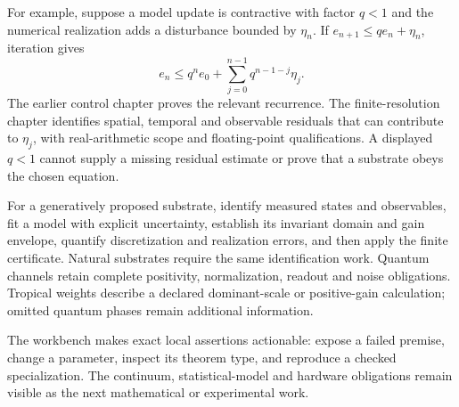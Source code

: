 For example, suppose a model update is contractive with factor \(q<1\) and
the numerical realization adds a disturbance bounded by \(\eta_n\). If
\(e_{n+1}\leq qe_n+\eta_n\), iteration gives
\[
 e_n\leq q^n e_0+\sum_{j=0}^{n-1}q^{n-1-j}\eta_j.
\]
The earlier control chapter proves the relevant recurrence.
The finite-resolution chapter identifies spatial, temporal and observable
residuals that can contribute to \(\eta_j\), with real-arithmetic scope and
floating-point qualifications. A displayed \(q<1\) cannot supply a missing
residual estimate or prove that a substrate obeys the chosen equation.

For a generatively proposed substrate, identify measured states and
observables, fit a model with explicit uncertainty, establish its invariant
domain and gain envelope, quantify discretization and realization errors,
and then apply the finite certificate. Natural substrates require the same
identification work. Quantum channels retain complete positivity,
normalization, readout and noise obligations. Tropical weights describe a
declared dominant-scale or positive-gain calculation; omitted quantum phases
remain additional information.

The workbench makes exact local assertions actionable: expose a failed
premise, change a parameter, inspect its theorem type, and reproduce a checked
specialization. The continuum, statistical-model and hardware obligations
remain visible as the next mathematical or experimental work.
